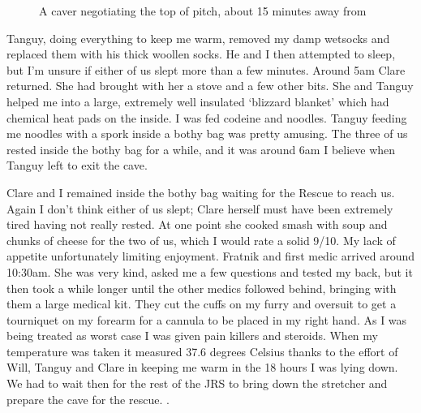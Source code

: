     \begin{figure}[t]
        \checkoddpage \ifoddpage \forcerectofloat \else \forceversofloat \fi
        \centering
        \caption{A caver negotiating the top of \protect{} pitch, about 15 minutes away from \protect{} }
        \label{KnotVeryGood}
    \end{figure}

    Tanguy, doing everything to keep me warm, removed my damp wetsocks and replaced them with his thick woollen socks. He and I then attempted to sleep, but I'm unsure if either of us slept more than a few minutes.
    Around 5am Clare returned. She had brought with her a stove and a few other bits. She and Tanguy helped me into a large, extremely well insulated `blizzard blanket' which had chemical heat pads on the inside. I was fed codeine and noodles. Tanguy feeding me noodles with a spork inside a bothy bag was pretty amusing. The three of us rested inside the bothy bag for a while, and it was around 6am I believe when Tanguy left to exit the cave.

    Clare and I remained inside the bothy bag waiting for the Rescue to reach us. Again I don't think either of us slept; Clare herself must have been extremely tired having not really rested. At one point she cooked smash with soup and chunks of cheese for the two of us, which I would rate a solid 9/10. My lack of appetite unfortunately limiting enjoyment.
    Fratnik and first medic arrived around 10:30am. She was very kind, asked me a few questions and tested my back, but it then took a while longer until the other medics followed behind, bringing with them a large medical kit. They cut the cuffs on my furry and oversuit to get a tourniquet on my forearm for a cannula to be placed in my right hand. As I was being treated as worst case I was given pain killers and steroids. When my temperature was taken it measured 37.6 degrees Celsius thanks to the effort of Will, Tanguy and Clare in keeping me warm in the 18 hours I was lying down.
    We had to wait then for the rest of the JRS to bring down the stretcher and prepare the cave for the rescue. .

